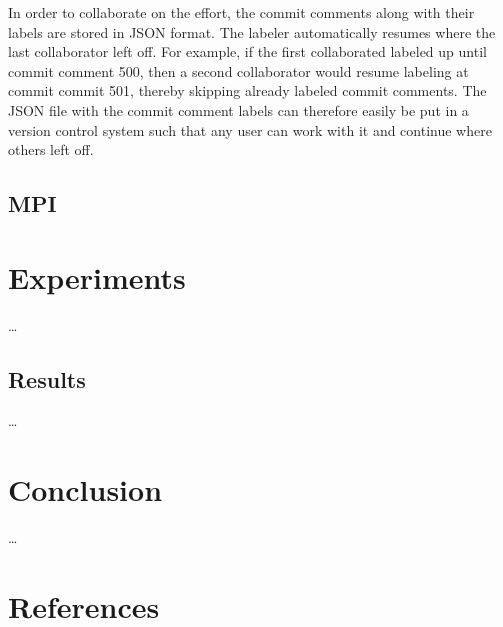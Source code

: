 \documentclass{article}
\begin{document}
In order to collaborate on the effort, the commit comments along with their
labels are stored in JSON format. The labeler automatically resumes where
the last collaborator left off. For example, if the first collaborated labeled
up until commit comment 500, then a second collaborator would resume labeling
at commit commit 501, thereby skipping already labeled commit comments. The
JSON file with the commit comment labels can therefore easily be put in a
version control system such that any user can work with it and continue where
others left off.

\subsection{MPI}\label{sec:mpi}

\section{Experiments}\label{sec:experiments}
\ldots

\subsection{Results}\label{sec:results}
\ldots

\section{Conclusion}\label{sec:conclusion}
\ldots

\section{References}\label{sec:references}
\printbibliography[heading=none]
\end{document}
